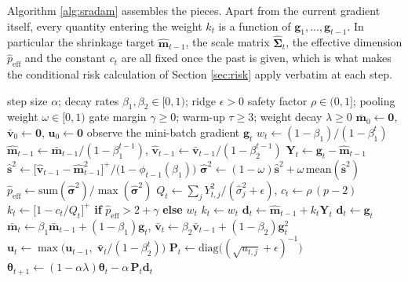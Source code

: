 \documentclass[pdflatex,sn-mathphys-num]{sn-jnl}%
\theoremstyle{thmstyleone}%
\theoremstyle{thmstyletwo}%
\theoremstyle{thmstylethree}%
\newcommand{\peff}{p_{\mathrm{eff}}}
\newcommand{\diag}{\mathrm{diag}}
\begin{document}
Algorithm \ref{alg:sradam} assembles the pieces. Apart from the current gradient itself, every quantity entering the weight $k_t$ is a function of $\bm g_1,\dots,\bm g_{t-1}$. In particular the shrinkage target $\hat{\bm m}_{t-1}$, the scale matrix $\widehat{\bm\Sigma}_t$, the effective dimension $\hat\peff$ and the constant $c_t$ are all fixed once the past is given, which is what makes the conditional risk calculation of Section \ref{sec:risk} apply verbatim at each step.

\begin{algorithm}[t]
\caption{SR-Adam, applied blockwise}
\label{alg:sradam}
\begin{algorithmic}[1]
\Require step size $\alpha$; decay rates $\beta_1,\beta_2\in[0,1)$; ridge $\epsilon>0$
\Statex \hspace{1.2em} safety factor $\rho\in(0,1]$; pooling weight $\omega\in[0,1)$
\Statex \hspace{1.2em} gate margin $\gamma\ge0$; warm-up $\tau\ge3$; weight decay $\lambda\ge0$
\State $\bar{\bm m}_0\gets\bm 0$, $\bar{\bm v}_0\gets\bm 0$, $\bm u_0\gets\bm 0$
  \State observe the mini-batch gradient $\bm g_t$
  \State $w_t\gets(1-\beta_1)/(1-\beta_1^{t})$ 
    \State $\hat{\bm m}_{t-1}\gets\bar{\bm m}_{t-1}/(1-\beta_1^{t-1})$, \quad $\hat{\bm v}_{t-1}\gets\bar{\bm v}_{t-1}/(1-\beta_2^{t-1})$
    \State $\bm Y_t\gets\bm g_t-\hat{\bm m}_{t-1}$
      \State $\hat{\bm s}^2\gets\bigl[\hat{\bm v}_{t-1}-\hat{\bm m}_{t-1}^{2}\bigr]^{+}\big/\bigl(1-\phi_{t-1}(\beta_1)\bigr)$ 
      \State $\hat{\bm\sigma}^2\gets(1-\omega)\hat{\bm s}^2+\omega\,\mathrm{mean}(\hat{\bm s}^2)$ 
      \State $\hat\peff\gets\mathrm{sum}(\hat{\bm\sigma}^2)\big/\max(\hat{\bm\sigma}^2)$
      \State $Q_t\gets\sum_{j}Y^2_{t,j}/(\hat\sigma^2_{j}+\epsilon)$, \quad $c_t\gets\rho\,(p-2)$
      \State $k_t\gets\bigl[1-c_t/Q_t\bigr]^{+}$ \textbf{if} $\hat\peff>2+\gamma$ \textbf{else} $w_t$
    \Else
      \State $k_t\gets w_t$
    \EndIf
    \State $\bm d_t\gets\hat{\bm m}_{t-1}+k_t\bm Y_t$
  \Else
    \State $\bm d_t\gets\bm g_t$
  \EndIf
  \State $\bar{\bm m}_t\gets\beta_1\bar{\bm m}_{t-1}+(1-\beta_1)\bm g_t$, \quad $\bar{\bm v}_t\gets\beta_2\bar{\bm v}_{t-1}+(1-\beta_2)\bm g_t^{2}$
  \State $\bm u_t\gets\max\bigl(\bm u_{t-1},\;\bar{\bm v}_t/(1-\beta_2^{t})\bigr)$ 
  \State $\bm P_t\gets\diag\bigl((\sqrt{u_{t,j}}+\epsilon)^{-1}\bigr)$
  \State $\bm\theta_{t+1}\gets(1-\alpha\lambda)\bm\theta_t-\alpha\,\bm P_t\bm d_t$
\EndFor
\end{algorithmic}
\end{algorithm}
\end{document}
